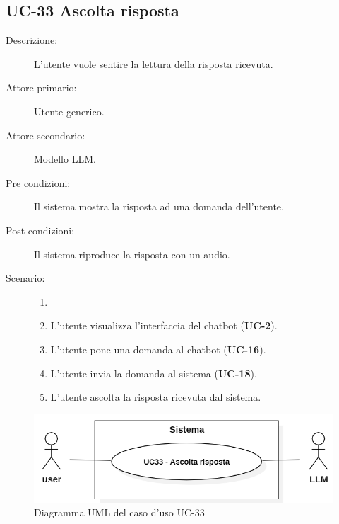 \subsection{UC-33 Ascolta risposta}
\begin{description}
    \item[Descrizione:] L'utente vuole sentire la lettura della risposta ricevuta.
    \item[Attore primario:] Utente generico.
    \item[Attore secondario:] Modello LLM.
    \item[Pre condizioni:] Il sistema mostra la risposta ad una domanda dell'utente.
    \item[Post condizioni:] Il sistema riproduce la risposta con un audio.
    \item[Scenario:]
    \begin{enumerate}
        \item[] 
        \item L’utente visualizza l'interfaccia del chatbot (\textbf{UC-2}).
        \item L’utente pone una domanda al chatbot (\textbf{UC-16}).
        \item L'utente invia la domanda al sistema (\textbf{UC-18}).
        \item L'utente ascolta la risposta ricevuta dal sistema.
    \end{enumerate}
\end{description}

\begin{figure}[H]
    \centering
    \includegraphics[width=0.9\linewidth]{UC33.PNG}
    \caption{Diagramma UML del caso d'uso UC-33}
    \label{fig:UC33}
\end{figure}